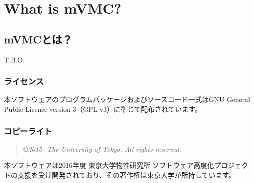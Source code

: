 \chapter{What is mVMC?}
\label{Ch:whatismVMC}
\section{mVMCとは？}
 T.B.D. 

\subsection{ライセンス}
本ソフトウェアのプログラムパッケージおよびソースコード一式はGNU General Public License version 3（GPL v3）に準じて配布されています。

\subsection{コピーライト}
\begin{quote}
{\it \copyright  2015- The University of Tokyo.} {\it All rights reserved.}
\end{quote}
本ソフトウェアは2016年度 東京大学物性研究所 ソフトウェア高度化プロジェクトの支援を受け開発されており、その著作権は東京大学が所持しています。

